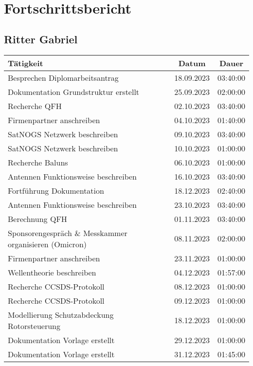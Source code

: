 \chapter{Fortschrittsbericht}

\section{Ritter Gabriel}

\begin{longtable}{|l|c|c|}
	\hline
	\textbf{Tätigkeit} & \textbf{Datum} & \textbf{Dauer} \\
	\hline
	Besprechen Diplomarbeitsantrag & 18.09.2023 & 03:40:00 \\
	\hline
	Dokumentation Grundstruktur erstellt & 25.09.2023 & 02:00:00 \\
	\hline
	Recherche QFH & 02.10.2023 & 03:40:00 \\
	\hline
	Firmenpartner anschreiben & 04.10.2023 & 01:40:00 \\
	\hline
	SatNOGS Netzwerk beschreiben & 09.10.2023 & 03:40:00 \\
	\hline
	SatNOGS Netzwerk beschreiben & 10.10.2023 & 01:00:00 \\
	\hline
	Recherche Baluns & 06.10.2023 & 01:00:00 \\
	\hline
	Antennen Funktionsweise beschreiben & 16.10.2023 & 03:40:00 \\
	\hline
	Fortführung Dokumentation & 18.12.2023 & 02:40:00 \\
	\hline
	Antennen Funktionsweise beschreiben & 23.10.2023 & 03:40:00 \\
	\hline
	Berechnung QFH & 01.11.2023 & 03:40:00 \\
	\hline
	Sponsorengespräch \& Messkammer organisieren (Omicron) & 08.11.2023 & 02:00:00 \\
	\hline
	Firmenpartner anschreiben & 23.11.2023 & 01:00:00 \\
	\hline
	Wellentheorie beschreiben & 04.12.2023 & 01:57:00 \\
	\hline
	Recherche CCSDS-Protokoll & 08.12.2023 & 01:00:00 \\
	\hline
	Recherche CCSDS-Protokoll & 09.12.2023 & 01:00:00 \\
	\hline
	Modellierung Schutzabdeckung Rotorsteuerung & 18.12.2023 & 01:00:00 \\
	\hline
	Dokumentation Vorlage erstellt & 29.12.2023 & 01:00:00 \\
	\hline
	Dokumentation Vorlage erstellt & 31.12.2023 & 01:45:00 \\

\end{longtable}

